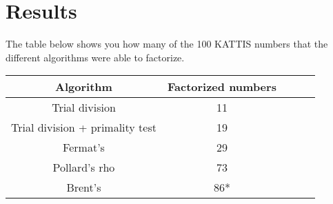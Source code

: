 \documentclass[paper=a4, fontsize=11pt,numbers=endperiod]{scrartcl} %
\numberwithin{equation}{section} %
\numberwithin{figure}{section} %
\numberwithin{table}{section} %
\begin{document}


\section{Results}

The table below shows you how many of the 100 KATTIS numbers that the different algorithms were able to factorize.

    \begin{tabular}{|c|c|c|c|c|}
    \hline
    \textbf{Algorithm} & \textbf{Factorized numbers} \\ \hline
    Trial division & 11 \\ \hline
    Trial division + primality test & 19 \\ \hline
    Fermat's & 29 \\ \hline
    Pollard's rho & 73 \\ \hline
    Brent's & 86* \\ \hline
    \end{tabular}
    \hspace{10pt}
\end{document}
